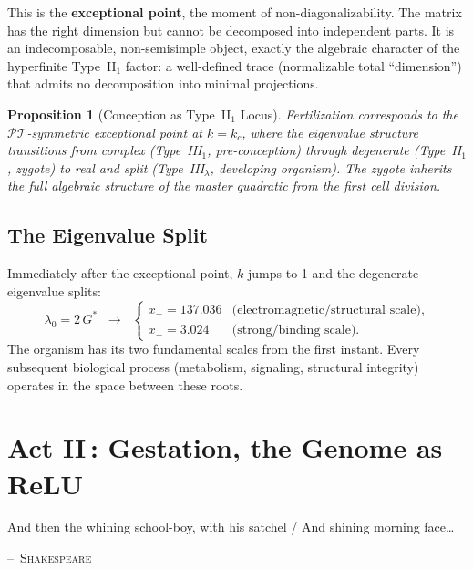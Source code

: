 \documentclass[12pt, letterpaper]{article}
\theoremstyle{plain}
\newtheorem{proposition}[theorem]{Proposition}
\theoremstyle{definition}
\theoremstyle{remark}
\newcommand{\Gstar}{{G^{*}}}              %
\begin{document}
This is the \textbf{exceptional point}, the moment of non-diagonalizability. The matrix has the right dimension but cannot be decomposed into independent parts. It is an indecomposable, non-semisimple object, exactly the algebraic character of the hyperfinite Type~II$_1$ factor: a well-defined trace (normalizable total ``dimension'') that admits no decomposition into minimal projections.

\begin{proposition}[Conception as Type~II$_1$ Locus]\label{prop:conception}
  Fertilization corresponds to the $\mathcal{PT}$-symmetric exceptional point at $k = k_c$, where the eigenvalue structure transitions from complex (Type~III$_1$, pre-conception) through degenerate (Type~II$_1$, zygote) to real and split (Type~III$_\lambda$, developing organism). The zygote inherits the full algebraic structure of the master quadratic from the first cell division.
\end{proposition}

\subsection{The Eigenvalue Split}

Immediately after the exceptional point, $k$ jumps to 1 and the degenerate eigenvalue splits:
\begin{equation}\label{eq:split}
  \lambda_0 = 2\,\Gstar \;\;\longrightarrow\;\;
  \begin{cases}
    x_+ = 137.036 & \text{(electromagnetic/structural scale)}, \\
    x_- = 3.024   & \text{(strong/binding scale)}.
  \end{cases}
\end{equation}
The organism has its two fundamental scales from the first instant. Every subsequent biological process (metabolism, signaling, structural integrity) operates in the space between these roots.


\section{\texorpdfstring{Act II\,: Gestation, the Genome as ReLU}{Act II: Gestation, the Genome as ReLU}}
\label{sec:act2}

\epigraph{And then the whining school-boy, with his satchel / And shining morning face\ldots}{\textsc{--~Shakespeare}}
\end{document}
